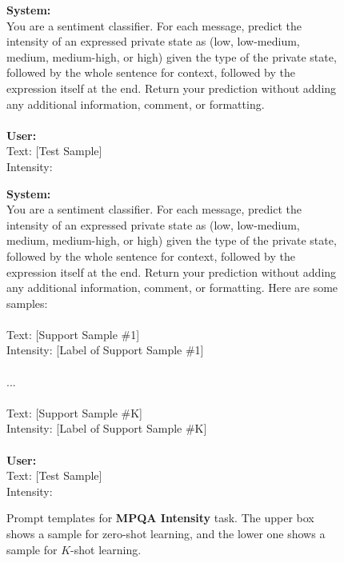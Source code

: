 \documentclass[11pt]{article}
\theoremstyle{definition}
\begin{document}
\begin{figure*} [htb]
    \centering
    \begin{mdframed}
    \small
    \textbf{System:} \\
    You are a sentiment classifier. For each message, predict the intensity of an expressed private state as (low, low-medium, medium, medium-high, or high) given the type of the private state, followed by the whole sentence for context, followed by the expression itself at the end. Return your prediction without adding any additional information, comment, or formatting. \\
    \\
    \textbf{User:} \\
    Text: [Test Sample] \\
    Intensity: 
    
    \end{mdframed}
    \begin{mdframed}
    \small
    \textbf{System:} \\
    You are a sentiment classifier. For each message, predict the intensity of an expressed private state as (low, low-medium, medium, medium-high, or high) given the type of the private state, followed by the whole sentence for context, followed by the expression itself at the end. Return your prediction without adding any additional information, comment, or formatting. Here are some samples: \\
    \\
    Text: [Support Sample \#1] \\
    Intensity: [Label of Support Sample \#1] \\
    \\
    ... \\
    \\
    Text: [Support Sample \#K] \\
    Intensity: [Label of Support Sample \#K] \\
    \\
    \textbf{User:} \\
    Text: [Test Sample] \\
    Intensity:     
    \end{mdframed}
	\caption{Prompt templates for {\bf MPQA Intensity} task. The upper box shows a sample for zero-shot learning, and the lower one shows a sample for $K$-shot learning.}
	\label{fig:icl-template-i}
\end{figure*}
\end{document}
